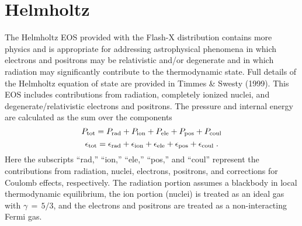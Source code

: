 \section{Helmholtz}
\label{Sec:Eos Helmholtz}

The Helmholtz EOS%
provided with the
Flash-X distribution contains more physics and is appropriate for
addressing astrophysical phenomena in which electrons and positrons
may be relativistic and/or degenerate and in which radiation may
significantly contribute to the thermodynamic state.
Full details of the Helmholtz equation of state are provided in Timmes \& Swesty
(1999).
This EOS includes
contributions from radiation, completely ionized nuclei, and
degenerate/relativistic electrons and positrons.  The pressure and
internal energy are calculated as the sum over the components
\begin{equation}
\label {Eqn:eos3a}
P_{\rm tot} = P_{\rm rad} + P_{\rm ion} + P_{\rm ele} + P_{\rm pos} + P_{\rm
coul}
\end{equation}
\begin{equation}
\label {Eqn:eos3b}
\epsilon_{\rm tot} = \epsilon_{\rm rad} + \epsilon_{\rm ion} +
\epsilon_{\rm ele} + \epsilon_{\rm pos}  + \epsilon_{\rm coul} \; .
\end{equation}
Here the subscripts ``rad,'' ``ion,'' ``ele,'' ``pos,'' and ``coul'' represent
the contributions from radiation, nuclei, electrons, positrons, and
corrections for Coulomb effects, respectively.
The radiation portion assumes a blackbody in local thermodynamic
equilibrium, the ion portion (nuclei) is treated as an ideal gas
with $\gamma \, = \, 5/3$, and the electrons and positrons are treated as a
non-interacting Fermi gas.

